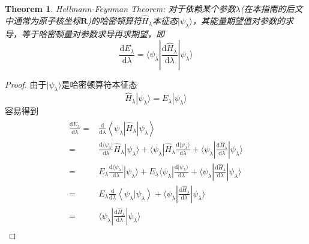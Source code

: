 \documentclass{article}
\newtheorem{theorem}{Theorem}[section]
\newtheorem{proof}{Proof}[section]
\numberwithin{equation}{section}
\begin{document}
  \begin{theorem}
    Hellmann-Feynman Theorem:
    对于依赖某个参数$\lambda$(在本指南的后文中通常为原子核坐标$\mathbf{R}$)的哈密顿算符$\hat{H}_\lambda$本征态$|\psi_\lambda\rangle$，其能量期望值对参数的求导，等于哈密顿量对参数求导再求期望，即
    \begin{equation}
      \frac{\mathrm{d}E_\lambda}{\mathrm{d}\lambda} = \langle\psi_\lambda|\frac{\mathrm{d}\hat{H}_\lambda}{\mathrm{d}\lambda}|\psi_\lambda\rangle
    \end{equation}
  \end{theorem}

  \begin{proof}
    由于$|\psi_\lambda\rangle$是哈密顿算符本征态
    \begin{equation*}
      \hat{H}_\lambda|\psi_\lambda\rangle=E_\lambda|\psi_\lambda\rangle
    \end{equation*}  
    容易得到
    \begin{align*}
      \begin{aligned}
        \frac{\mathrm{d} E_{\lambda}}{\mathrm{d} \lambda}=&\frac{\mathrm{d}}{\mathrm{d} \lambda}\left\langle\psi_{\lambda}\left|\hat{H}_{\lambda}\right| \psi_{\lambda}\right\rangle\\
        =&\frac{\mathrm{d} \langle\psi_\lambda|}{\mathrm{d} \lambda}\hat{H}_\lambda|\psi_\lambda\rangle+\langle\psi_\lambda|\hat{H}_\lambda\frac{\mathrm{d} |\psi_\lambda\rangle}{\mathrm{d} \lambda}+\langle\psi_\lambda|\frac{\mathrm{d}\hat{H}_\lambda}{\mathrm{d}\lambda}|\psi_\lambda\rangle\\
        =&E_\lambda\frac{\mathrm{d} \langle\psi_\lambda|}{\mathrm{d} \lambda}|\psi_\lambda\rangle+E_\lambda\langle\psi_\lambda|\frac{\mathrm{d} |\psi_\lambda\rangle}{\mathrm{d} \lambda}+\langle\psi_\lambda|\frac{\mathrm{d}\hat{H}_\lambda}{\mathrm{d}\lambda}|\psi_\lambda\rangle\\
        =&E_\lambda\frac{\mathrm{d}}{\mathrm{d}\lambda}\left\langle\psi_{\lambda} | \psi_{\lambda}\right\rangle+\langle\psi_\lambda|\frac{\mathrm{d}\hat{H}_\lambda}{\mathrm{d}\lambda}|\psi_\lambda\rangle\\
        =&\langle\psi_\lambda|\frac{\mathrm{d}\hat{H}_\lambda}{\mathrm{d}\lambda}|\psi_\lambda\rangle
      \end{aligned}
    \end{align*}
  \end{proof}
\end{document}
